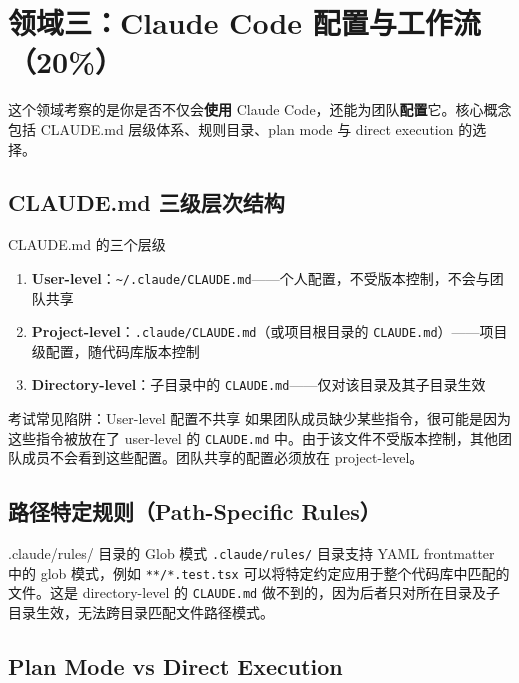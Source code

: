 \section{领域三：Claude Code 配置与工作流（20\%）}

这个领域考察的是你是否不仅会\textbf{使用} Claude Code，还能为团队\textbf{配置}它。核心概念包括 CLAUDE.md 层级体系、规则目录、plan mode 与 direct execution 的选择。

\subsection{CLAUDE.md 三级层次结构}

\begin{importantbox}{CLAUDE.md 的三个层级}
\begin{enumerate}[leftmargin=1.5em]
    \item \textbf{User-level}：\texttt{\textasciitilde/.claude/CLAUDE.md}——个人配置，不受版本控制，不会与团队共享
    \item \textbf{Project-level}：\texttt{.claude/CLAUDE.md}（或项目根目录的 \texttt{CLAUDE.md}）——项目级配置，随代码库版本控制
    \item \textbf{Directory-level}：子目录中的 \texttt{CLAUDE.md}——仅对该目录及其子目录生效
\end{enumerate}
\end{importantbox}

\begin{warningbox}{考试常见陷阱：User-level 配置不共享}
如果团队成员缺少某些指令，很可能是因为这些指令被放在了 user-level 的 \texttt{CLAUDE.md} 中。由于该文件不受版本控制，其他团队成员不会看到这些配置。团队共享的配置必须放在 project-level。
\end{warningbox}

\subsection{路径特定规则（Path-Specific Rules）}

\begin{knowledgebox}{.claude/rules/ 目录的 Glob 模式}
\texttt{.claude/rules/} 目录支持 YAML frontmatter 中的 glob 模式，例如 \texttt{**/*.test.tsx} 可以将特定约定应用于整个代码库中匹配的文件。这是 directory-level 的 \texttt{CLAUDE.md} 做不到的，因为后者只对所在目录及子目录生效，无法跨目录匹配文件路径模式。
\end{knowledgebox}

\subsection{Plan Mode vs Direct Execution}

